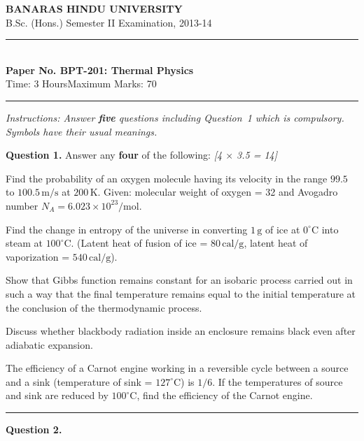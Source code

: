 \documentclass[11pt,a4paper]{article}
\newcommand{\pts}[1]{\hfill   \textit{[#1]}}
\begin{document}
\begin{center}
  {\large\bfseries BANARAS HINDU UNIVERSITY}\\[2pt]
  {\normalsize B.Sc. (Hons.) Semester II Examination, 2013-14}\\[6pt]
  \rule{0.8\linewidth}{0.5pt}\\[6pt]
  {\large\bfseries Paper No. BPT-201: Thermal Physics}\\[4pt]
  {\normalsize Time: 3 Hours\hfill Maximum Marks: 70}
\end{center}
\rule{\linewidth}{0.4pt}
\smallskip



\noindent   \textit{Instructions: Answer   \textbf{five} questions including Question~1 which is compulsory. Symbols have their usual meanings.}
\bigskip




\noindent   \textbf{Question 1.} Answer any   \textbf{four} of the following: \pts{4 $ \times$ 3.5 = 14}

\begin{parts}
  \item Find the probability of an oxygen molecule having its velocity in the range $99.5$ to $100.5\, \text{m/s}$ at $200\, \text{K}$. Given: molecular weight of oxygen = 32 and Avogadro number $N_A = 6.023  \times 10^{23}/ \text{mol}$.
  \item Find the change in entropy of the universe in converting $1\, \text{g}$ of ice at $0^\circ \text{C}$ into steam at $100^\circ \text{C}$. (Latent heat of fusion of ice = $80\, \text{cal/g}$, latent heat of vaporization = $540\, \text{cal/g}$).
  \item Show that Gibbs function remains constant for an isobaric process carried out in such a way that the final temperature remains equal to the initial temperature at the conclusion of the thermodynamic process.
  \item Discuss whether blackbody radiation inside an enclosure remains black even after adiabatic expansion.
  \item The efficiency of a Carnot engine working in a reversible cycle between a source and a sink (temperature of sink = $127^\circ \text{C}$) is $1/6$. If the temperatures of source and sink are reduced by $100^\circ \text{C}$, find the efficiency of the Carnot engine.
\end{parts}

\medskip\rule{\linewidth}{0.2pt}




\noindent   \textbf{Question 2.}
\end{document}
